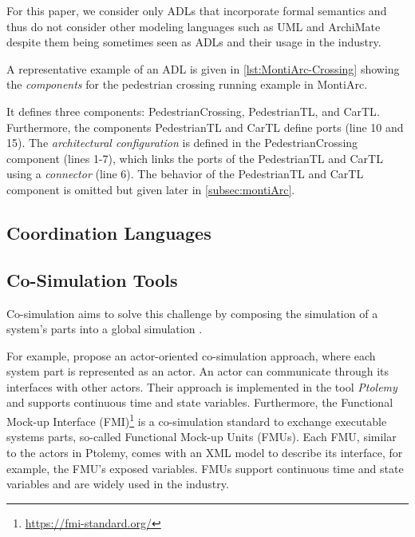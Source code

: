 \documentclass[runningheads]{llncs}
\begin{document}
For this paper, we consider only ADLs that incorporate formal semantics and thus do not consider other modeling languages such as UML \cite{objectmanagementgroupUnifiedModelingLanguage2017} and ArchiMate \cite{theopengroupArchiMateSpecification2023} despite them being sometimes seen as ADLs and their usage in the industry.

A representative example of an ADL is given in  \autoref{lst:MontiArc-Crossing} showing the \textit{components} for the pedestrian crossing running example in MontiArc.



It defines three components: \textsf{PedestrianCrossing}, \textsf{PedestrianTL}, and \textsf{CarTL}.
Furthermore, the components \textsf{PedestrianTL} and \textsf{CarTL} define ports (line 10 and 15).
The \textit{architectural configuration} is defined in the \textsf{PedestrianCrossing} component (lines 1-7), which links the ports of the \textsf{PedestrianTL} and \textsf{CarTL} using a \textit{connector} (line 6).
The behavior of the \textsf{PedestrianTL} and \textsf{CarTL} component is omitted but given later in \autoref{subsec:montiArc}.

\subsection{Coordination Languages}

\subsection{Co-Simulation Tools}
\cite{gomesCoSimulationSurvey2019} %

Co-simulation aims to solve this challenge by composing the simulation of a system's parts into a global simulation \cite{gomesCoSimulationSurvey2019}.

For example, \cite{ekerTamingHeterogeneityPtolemy2003} propose an actor-oriented co-simulation approach, where each system part is represented as an actor.
An actor can communicate through its interfaces with other actors.
Their approach is implemented in the tool \textit{Ptolemy} and supports continuous time and state variables.
Furthermore, the Functional Mock-up Interface (FMI)\footnote{\url{https://fmi-standard.org/}} is a co-simulation standard to exchange executable systems parts, so-called Functional Mock-up Units (FMUs).
Each FMU, similar to the actors in Ptolemy, comes with an XML model to describe its interface, for example, the FMU's exposed variables.
FMUs support continuous time and state variables and are widely used in the industry.
\end{document}
